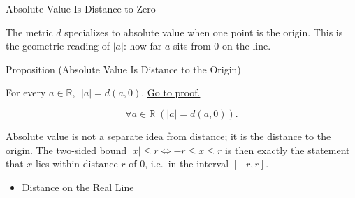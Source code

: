 \label{sec:absolute-value-as-distance}

\begin{topicbox}{Absolute Value Is Distance to Zero}
\begin{exposition}
The metric $d$ specializes to absolute value when one point is the origin. This is the geometric reading of $|a|$: how far $a$ sits from $0$ on the line.
\end{exposition}
\end{topicbox}
\begin{propositionbox}{Proposition (Absolute Value Is Distance to the Origin)}
\begin{proposition}
\label{prop:abs-value-is-distance-to-zero}
For every $a\in\mathbb{R}$, $\;|a|=d(a,0)$.
\hyperref[prf:abs-value-is-distance-to-zero]{Go to proof.}
\end{proposition}
\end{propositionbox}
\begin{remark*}
\[
\forall a\in\mathbb{R}\;(|a|=d(a,0)).
\]
\end{remark*}
\begin{remark*}[Interpretation]
Absolute value is not a separate idea from distance; it is the distance to the origin. The two-sided bound $|x|\le r \Leftrightarrow -r\le x\le r$ is then exactly the statement that $x$ lies within distance $r$ of $0$, i.e.\ in the interval $[-r,r]$.
\end{remark*}
\begin{dependencies}
\begin{itemize}
  \item \hyperref[def:distance-on-real-line]{Distance on the Real Line}
\end{itemize}
\end{dependencies}

